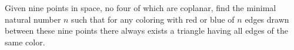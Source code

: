 Given nine points in space, no four of which are coplanar, find the minimal natural number $n$ such that for any coloring with red or blue of $n$ edges drawn between these nine points there always exists a triangle having all edges of the same color.
